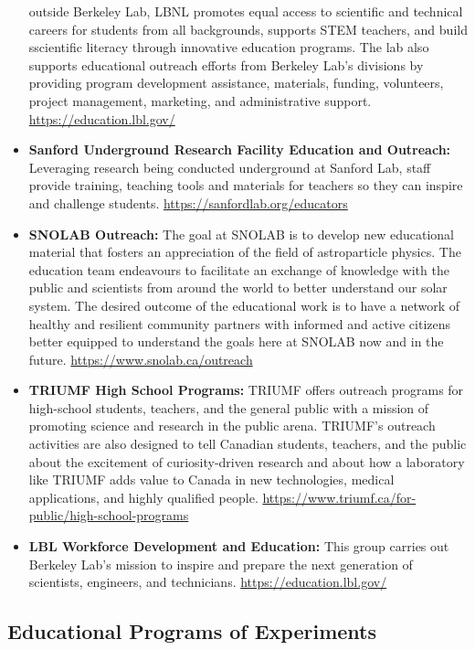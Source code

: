 \begin{itemize}
  outside Berkeley Lab, LBNL promotes equal access to scientific and
  technical careers for students from all backgrounds, supports STEM
  teachers, and build sscientific literacy through innovative education
  programs. The lab also supports educational outreach efforts from
  Berkeley Lab's divisions by providing program development assistance,
  materials, funding, volunteers, project management, marketing, and
  administrative support. \url{https://education.lbl.gov/}
\item
  \textbf{Sanford Underground Research Facility Education and Outreach:}
  Leveraging research being conducted underground at Sanford Lab, staff
  provide training, teaching tools and materials for teachers so they
  can inspire and challenge students.
  \url{https://sanfordlab.org/educators}
\item
  \textbf{SNOLAB Outreach:} The goal at SNOLAB is to develop new
  educational material that fosters an appreciation of the field of
  astroparticle physics. The education team endeavours to facilitate an
  exchange of knowledge with the public and scientists from around the
  world to better understand our solar system. The desired outcome of
  the educational work is to have a network of healthy and resilient
  community partners with informed and active citizens better equipped
  to understand the goals here at SNOLAB now and in the future.
  \url{https://www.snolab.ca/outreach}
\item
  \textbf{TRIUMF High School Programs:} TRIUMF offers outreach programs
  for high-school students, teachers, and the general public with a
  mission of promoting science and research in the public arena.
  TRIUMF's outreach activities are also designed to tell Canadian
  students, teachers, and the public about the excitement of
  curiosity-driven research and about how a laboratory like TRIUMF adds
  value to Canada in new technologies, medical applications, and highly
  qualified people.
  \url{https://www.triumf.ca/for-public/high-school-programs}
\item
  \textbf{LBL Workforce Development and Education:} This group carries
  out Berkeley Lab's mission to inspire and prepare the next generation
  of scientists, engineers, and technicians.
  \url{https://education.lbl.gov/}
\end{itemize}

\subsection{Educational Programs of
Experiments}\label{databases:subsec:eduprograms}

